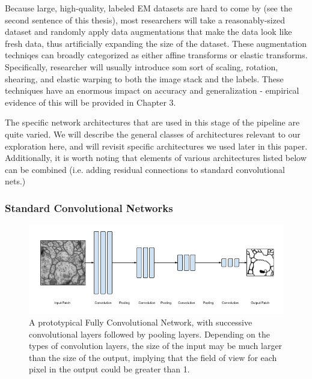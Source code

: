 Because large, high-quality, labeled EM datasets are hard to come by (see the second sentence of this thesis), most researchers will take a reasonably-sized dataset and randomly apply data augmentations that make the data look like fresh data, thus artificially expanding the size of the dataset. These augmentation techniqes can broadly categorized as either affine transforms or elastic transforms. Specifically, researcher will usually introduce som sort of scaling, rotation, shearing, and elastic warping to both the image stack and the labels. These techniques have an enormous impact on accuracy and generalization - empirical evidence of this will be provided in Chapter 3.

The specific network architectures that are used in this stage of the pipeline are quite varied. We will describe the general classes of architectures relevant to our exploration here, and will revisit specific architectures we used later in this paper. Additionally, it is worth noting that elements of various architectures listed below can be combined (i.e. adding residual connections to standard convolutional nets.)

\subsubsection{Standard Convolutional Networks}

\begin{figure}
\centering
\includegraphics[width=\textwidth]{img/Fully_Convolutional_Network.png}
\caption[A prototypical Fully Convolutional Neural Network]{A prototypical Fully Convolutional Network, with successive convolutional layers followed by pooling layers. Depending on the types of convolution layers, the size of the input may be much larger than the size of the output, implying that the field of view for each pixel in the output could be greater than 1.}
\label{fig:fully_conv_net}
\end{figure}

